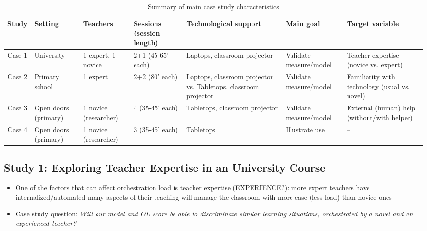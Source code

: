 \documentclass[10pt,journal,compsoc]{IEEEtran}
\begin{document}
\begin{table}[!t]
\caption{Summary of main case study characteristics}
\label{tab:cases}
\centering
\begin{tabular}{|c||p{1.5cm}|p{1.5cm}|p{2cm}|p{3.4cm}|p{2cm}|p{3.4cm}|}
\hline
Study & Setting & Teachers & Sessions (session length) & Technological support & Main goal & Target variable\\
\hline
\hline
Case 1 & University & 1 expert, 1 novice & 2+1 (45-65' each) & Laptops, classroom projector & Validate measure/model & Teacher expertise (novice vs. expert) \\
\hline
Case 2 & Primary school & 1 expert & 2+2 (80' each) & Laptops, classroom projector vs. Tabletops, classroom projector & Validate measure/model & Familiarity with technology (usual vs. novel) \\
\hline
Case 3 & Open doors (primary) & 1 novice (researcher) & 4 (35-45' each) & Tabletops, classroom projector & Validate measure/model & External (human) help (without/with helper) \\
\hline
Case 4 & Open doors (primary) & 1 novice (researcher) & 3 (35-45' each) & Tabletops & Illustrate use & -- \\
\hline
\end{tabular}
\end{table}



\subsection{Study 1: Exploring Teacher Expertise in an University Course}

\begin{itemize}
\item One of the factors that can affect orchestration load is teacher expertise (EXPERIENCE?): more expert teachers have internalized/automated many aspects of their teaching \cite{prieto2011recurrent,feldon2007cognitive} will manage the classroom with more ease (less load) than novice ones
\item Case study question: \textit{Will our model and OL score be able to discriminate similar learning situations, orchestrated by a novel and an experienced teacher?}
\end{itemize}
\end{document}
